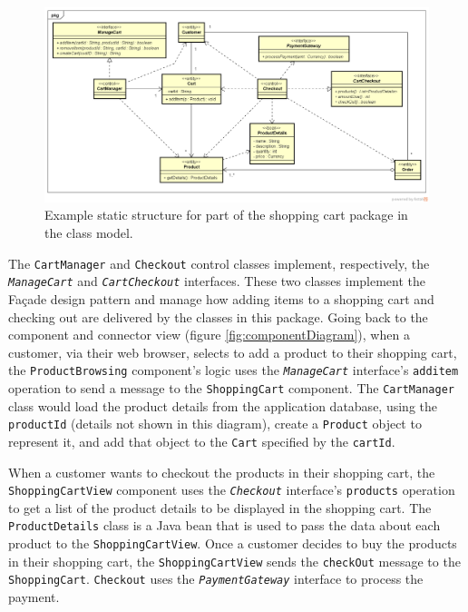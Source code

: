\begin{figure}[h]
    \centering
    \begin{adjustwidth}{-10mm}{-11mm}
        \includegraphics[trim=24 53 23 43,clip,width=0.98\paperwidth]{images/uml/shopping_cart_class_diagram.png}
    \end{adjustwidth}
    \caption{Example static structure for part of the shopping cart package in the class model.}
    \label{fig:classDiagram}
\end{figure}

\noindent
The \texttt{CartManager} and \texttt{Checkout} control classes implement, respectively, the \texttt{\textsl{ManageCart}} and \texttt{\textsl{Cart\-Checkout}} interfaces.
These two classes implement the Façade design pattern and manage how adding items to a shopping cart and checking out are delivered by the classes in this package.
Going back to the component and connector view (figure \ref{fig:componentDiagram}),
when a customer, via their web browser, selects to add a product to their shopping cart,
the \texttt{ProductBrowsing} component's logic uses the \texttt{\textsl{ManageCart}} interface's \texttt{additem} operation to send a message to the \texttt{ShoppingCart} component.
The \texttt{CartManager} class would load the product details from the application database, using the \texttt{productId} (details not shown in this diagram),
create a \texttt{Product} object to represent it, and add that object to the \texttt{Cart} specified by the \texttt{cartId}.

When a customer wants to checkout the products in their shopping cart, the \texttt{ShoppingCartView} component
uses the \texttt{\textsl{Checkout}} interface's \texttt{products} operation to get a list of the product details to be displayed in the shopping cart.
The \texttt{ProductDetails} class is a Java bean that is used to pass the data about each product to the \texttt{ShoppingCartView}.
Once a customer decides to buy the products in their shopping cart, the \texttt{ShoppingCartView} sends the \texttt{checkOut} message to the \texttt{ShoppingCart}.
\texttt{Checkout} uses the \texttt{\textsl{PaymentGateway}} interface to process the payment.

